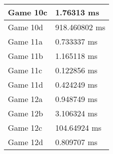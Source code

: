 \begin{multicols}{2}
\begin{tabular}{|l|l|}
	Game 10c & 1.76313 ms \\ \hline
	Game 10d & 918.460802 ms \\ \hline
	Game 11a & 0.733337 ms \\ \hline
	Game 11b & 1.165118 ms \\ \hline
	Game 11c & 0.122856 ms \\ \hline
	Game 11d & 0.424249 ms \\ \hline
	Game 12a & 0.948749 ms \\ \hline
	Game 12b & 3.106324 ms \\ \hline
	Game 12c & 104.64924 ms \\ \hline
	Game 12d & 0.809707 ms \\ \hline
\end{tabular}\\
\end{multicols}